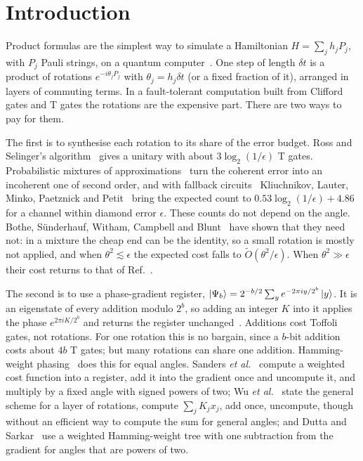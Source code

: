 \documentclass[aps,prx,twocolumn,superscriptaddress,nofootinbib,longbibliography]{revtex4-2}
\theoremstyle{remark}
\begin{document}
\maketitle

\section{Introduction}

Product formulas are the simplest way to simulate a Hamiltonian
$H=\sum_j h_jP_j$, with $P_j$ Pauli strings, on a quantum
computer~\cite{Lloyd1996,Suzuki1991,Childs2021}. One step of length $\delta t$ is a product of
rotations $e^{-i\theta_jP_j}$ with $\theta_j=h_j\delta t$ (or a fixed fraction of it), arranged
in layers of commuting terms. In a fault-tolerant computation built from Clifford gates and T
gates the rotations are the expensive part. There are two ways to pay for them.

The first is to synthesise each rotation to its share of the error budget. Ross and Selinger's
algorithm~\cite{RossSelinger2016} gives a unitary with about $3\log_2(1/\epsilon)$ T gates.
Probabilistic mixtures of approximations~\cite{Hastings2017,Campbell2017} turn the coherent
error into an incoherent one of second order, and with fallback circuits~\cite{Bocharov2015}
Kliuchnikov, Lauter, Minko, Paetznick and Petit~\cite{Kliuchnikov2023} bring the expected count
to $0.53\log_2(1/\epsilon)+4.86$ for a channel within diamond error $\epsilon$. These counts do
not depend on the angle. Bothe, S\"underhauf, Witham, Campbell and Blunt~\cite{Bothe2026} have
shown that they need not: in a mixture the cheap end can be the identity, so a small rotation is
mostly not applied, and when $\theta^2\lesssim\epsilon$ the expected cost falls to
$\tilde O(\theta^2/\epsilon)$. When $\theta^2\gg\epsilon$ their cost returns to that of
Ref.~\cite{Kliuchnikov2023}.

The second is to use a phase-gradient register,
$\ket{\Psi_b}=2^{-b/2}\sum_ye^{-2\pi iy/2^b}\ket{y}$. It is an eigenstate of every addition
modulo $2^b$, so adding an integer $K$ into it applies the phase $e^{2\pi iK/2^b}$ and returns
the register unchanged~\cite{Kitaev2002,Gidney2018}. Additions cost Toffoli gates, not
rotations. For one rotation this is no bargain, since a $b$-bit addition costs about $4b$ T
gates; but many rotations can share one addition. Hamming-weight
phasing~\cite{Gidney2018,Kivlichan2020} does this for equal angles. Sanders
\textit{et al.}~\cite{Sanders2020} compute a weighted cost function into a register, add it
into the gradient once and uncompute it, and multiply by a fixed angle with signed powers of
two; Wu \textit{et al.}~\cite{Wu2026} state the general scheme for a layer of rotations,
compute $\sum_jK_jx_j$, add once, uncompute, though without an efficient way to compute the sum
for general angles; and Dutta and Sarkar~\cite{Dutta2026} use a weighted Hamming-weight tree
with one subtraction from the gradient for angles that are powers of two.
\end{document}
